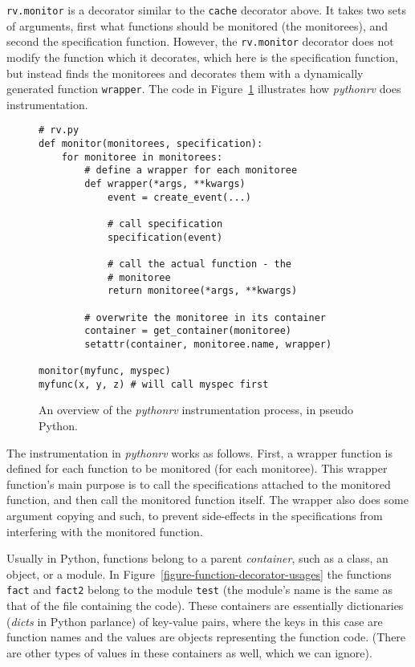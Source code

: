\texttt{rv.monitor} is a decorator similar to the \texttt{cache} decorator
above. It takes two sets of arguments, first what functions should be monitored
(the monitorees), and second the specification function. However, the
\texttt{rv.monitor} decorator does not modify the function which it decorates,
which here is the specification function, but instead finds the monitorees and
decorates them with a dynamically generated function \texttt{wrapper}. The code
in Figure~\ref{figure-instrumentation-overview} illustrates how
\textit{pythonrv} does instrumentation.

\begin{figure}[h!]
	\begin{center}
	\begin{minipage}{0.7\textwidth}
	\begin{lstlisting}
# rv.py
def monitor(monitorees, specification):
	for monitoree in monitorees:
		# define a wrapper for each monitoree
		def wrapper(*args, **kwargs)
			event = create_event(...)

			# call specification
			specification(event)

			# call the actual function - the
			# monitoree
			return monitoree(*args, **kwargs)

		# overwrite the monitoree in its container
		container = get_container(monitoree)
		setattr(container, monitoree.name, wrapper)

monitor(myfunc, myspec)
myfunc(x, y, z) # will call myspec first
	\end{lstlisting}
	\end{minipage}
	\end{center}

	\caption{An overview of the \textit{pythonrv} instrumentation process,
		in pseudo Python.}
	\label{figure-instrumentation-overview}
\end{figure}

The instrumentation in \textit{pythonrv} works as follows. First, a wrapper
function is defined for each function to be monitored (for each monitoree).
This wrapper function's main purpose is to call the specifications attached to
the monitored function, and then call the monitored function itself. The
wrapper also does some argument copying and such, to prevent side-effects in
the specifications from interfering with the monitored function.

Usually in Python, functions belong to a parent \textit{container}, such as a
class, an object, or a module\footnotemark. In
Figure~\ref{figure-function-decorator-usages} the functions \texttt{fact} and
\texttt{fact2} belong to the module \texttt{test} (the module's name is the
same as that of the file containing the code). These containers are essentially
dictionaries (\textit{dicts} in Python parlance) of key-value pairs, where the
keys in this case are function names and the values are objects representing
the function code. (There are other types of values in these containers as
well, which we can ignore).

